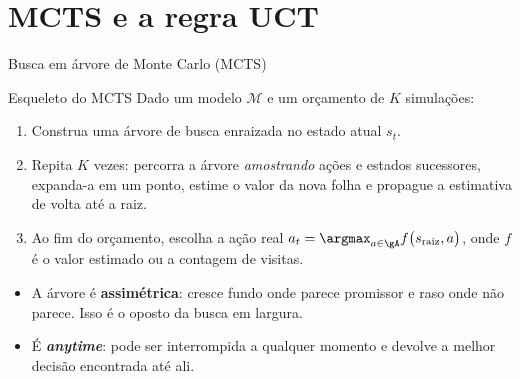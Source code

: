 \documentclass[aspectratio=169, 11pt]{beamer}
\newcommand{\Mmod}{\mathcal{M}}                 %
\newcommand{\raiz}{s_{\mathrm{raiz}}}
\begin{document}
\section{MCTS e a regra UCT}

\begin{frame}{Busca em árvore de Monte Carlo (MCTS)}
  \begin{algbox}{Esqueleto do MCTS}
    Dado um modelo $\Mmod$ e um orçamento de $K$ simulações:
    \begin{enumerate}\setlength{\itemsep}{0.25ex}
      \item Construa uma árvore de busca enraizada no estado atual $s_t$.
      \item Repita $K$ vezes: percorra a árvore \emph{amostrando} ações e
            estados sucessores, expanda-a em um ponto, estime o valor da nova
            folha e propague a estimativa de volta até a raiz.
      \item Ao fim do orçamento, escolha a ação real
            $a_t = \argmax_{a\in\gA} f\bigl(\raiz, a\bigr)$, onde $f$ é o valor
            estimado ou a contagem de visitas.
    \end{enumerate}
  \end{algbox}

  \pause
  \begin{itemize}
    \item A árvore é \textbf{assimétrica}: cresce fundo onde parece promissor e
          raso onde não parece. Isso é o oposto da busca em largura.
    \item É \textbf{\emph{anytime}}: pode ser interrompida a qualquer momento e
          devolve a melhor decisão encontrada até ali.
  \end{itemize}
\end{frame}
\end{document}
